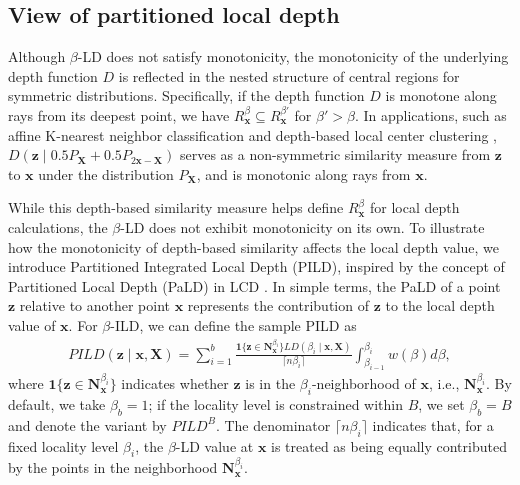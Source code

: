 \documentclass[final,3p,times]{elsarticle}
\newcommand{\vecx}{\mathbf{x}}
\newcommand{\vecX}{\mathbf{X}}
\newcommand{\vecN}{\mathbf{N}}
\newcommand{\vecz}{\mathbf{z}}
\begin{document}
\subsection{View of partitioned local depth}\label{sec: PALD}
Although $\beta$-LD does not satisfy monotonicity, the monotonicity of the underlying depth function $D$ is reflected in the nested structure of central regions for symmetric distributions. Specifically, if the depth function $D$ is monotone along rays from its deepest point, we have $R^\beta_\vecx \subseteq R^{\beta'}_\vecx$ for $\beta' > \beta$. In applications, such as affine K-nearest neighbor classification \cite{paindaveine2015nonparametrically} and depth-based local center clustering \cite{wang2025depth}, $D(\vecz \mid 0.5P_\vecX + 0.5P_{2\vecx - \vecX})$ serves as a non-symmetric similarity measure from $\vecz$ to $\vecx$ under the distribution $P_\vecX$, and is monotonic along rays from $\vecx$.

While this depth-based similarity measure helps define $R^\beta_\vecx$ for local depth calculations, the $\beta$-LD does not exhibit monotonicity on its own. To illustrate how the monotonicity of depth-based similarity affects the local depth value, we introduce Partitioned Integrated Local Depth (PILD), inspired by the concept of Partitioned Local Depth (PaLD) in LCD \cite{berenhaut2022social}. In simple terms, the PaLD of a point $ \vecz $ relative to another point $ \vecx $ represents the contribution of $ \vecz $ to the local depth value of $ \vecx $.
For $\beta$-ILD, we can define the sample PILD as
\begin{eqnarray}\label{eq:Cohesion_ild}
         PILD(\vecz \mid \vecx, \vecX) =\sum_{i=1}^{b}\frac{\mathbf{1}\{\vecz \in \vecN_\vecx^{\beta_{i}}\} LD(\beta_{i} \mid \vecx,\vecX)}{\lceil n\beta_{i} \rceil}\int_{\beta_{i-1}}^{\beta_{i}}w(\beta)d\beta,
\end{eqnarray}
where $ \mathbf{1}\{\vecz \in \vecN_\vecx^{\beta_{i}}\} $ indicates whether $\vecz$ is in the $\beta_i$-neighborhood of $\vecx$, i.e., $\vecN_\vecx^{\beta_i}$. By default, we take $\beta_b = 1$; if the locality level is constrained within $B$, we set $\beta_b = B$ and denote the variant by $PILD^B$. The denominator $\lceil n\beta_{i} \rceil$ indicates that, for a fixed locality level $\beta_i$, the $\beta$-LD value at $\vecx$ is treated as being equally contributed by the points in the neighborhood $\vecN_\vecx^{\beta_i}$.
\end{document}
